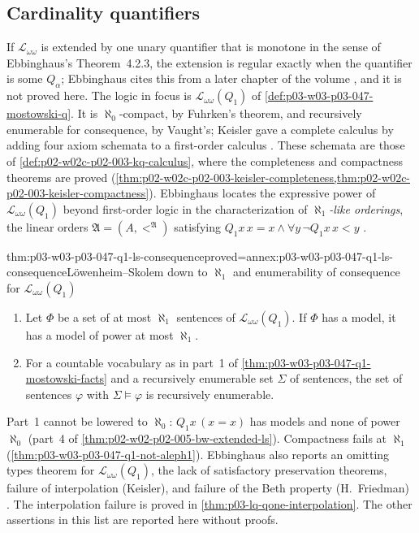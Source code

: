 \subsection{Cardinality quantifiers}

If \(\mathscr L_{\omega\omega}\) is extended by one unary quantifier that is
monotone in the sense of Ebbinghaus's Theorem~4.2.3, the extension is regular
exactly when the quantifier is some \(Q_\alpha\); Ebbinghaus cites this from
a later chapter of the volume \cite[Ch.~II, \S2.2, p.~34]{Ebbinghaus1985ExtendedLogics},
and it is not proved here.  The logic in focus is
\(\mathscr L_{\omega\omega}(Q_1)\) of \cref{def:p03-w03-p03-047-mostowski-q}.
It is \(\aleph_0\)-compact, by Fuhrken's theorem, and recursively enumerable
for consequence, by Vaught's; Keisler gave a complete calculus by adding four
axiom schemata to a first-order calculus
\cite[Ch.~II, \S2.2, Example~1, p.~34]{Ebbinghaus1985ExtendedLogics}.  These
schemata are those of \cref{def:p02-w02c-p02-003-kq-calculus}, where the
completeness and compactness theorems are proved
(\cref{thm:p02-w02c-p02-003-keisler-completeness,thm:p02-w02c-p02-003-keisler-compactness}).
Ebbinghaus locates the expressive power of
\(\mathscr L_{\omega\omega}(Q_1)\) beyond first-order logic in the
characterization of \emph{\(\aleph_1\)-like orderings}, the linear orders
\(\mathfrak A=(A,<^{\mathfrak A})\) satisfying
\(Q_1x\,x=x\land\forall y\,\neg Q_1x\,x<y\)
\cite[Ch.~II, \S2.2, Example~1, p.~34]{Ebbinghaus1985ExtendedLogics}.

\begin{hbtheorem}{thm:p03-w03-p03-047-q1-ls-consequence}{proved=annex:p03-w03-p03-047-q1-ls-consequence}{L\"owenheim--Skolem down to \(\aleph_1\) and enumerability of consequence for \(\mathscr L_{\omega\omega}(Q_1)\)}
\begin{enumerate}
 \item Let \(\Phi\) be a set of at most \(\aleph_1\) sentences of
       \(\mathscr L_{\omega\omega}(Q_1)\).  If \(\Phi\) has a model, it has a
       model of power at most \(\aleph_1\).
 \item For a countable vocabulary as in part~1 of
       \cref{thm:p03-w03-p03-047-q1-mostowski-facts} and a recursively
       enumerable set \(\Sigma\) of sentences, the set of sentences
       \(\varphi\) with \(\Sigma\models\varphi\) is recursively enumerable.
\end{enumerate}
\end{hbtheorem}

Part~1 cannot be lowered to \(\aleph_0\): \(Q_1x\,(x=x)\) has models and none
of power \(\aleph_0\) (part~4 of \cref{thm:p02-w02-p02-005-bw-extended-ls}).
Compactness fails at \(\aleph_1\) (\cref{thm:p03-w03-p03-047-q1-not-aleph1}).
Ebbinghaus also reports an omitting types theorem for
\(\mathscr L_{\omega\omega}(Q_1)\), the lack of satisfactory preservation
theorems, failure of interpolation (Keisler), and failure of the Beth
property (H.~Friedman)
\cite[Ch.~II, \S2.2, Example~1, p.~34]{Ebbinghaus1985ExtendedLogics}.
The interpolation failure is proved in
\cref{thm:p03-lq-qone-interpolation}. The other assertions in this
list are reported here without proofs.

